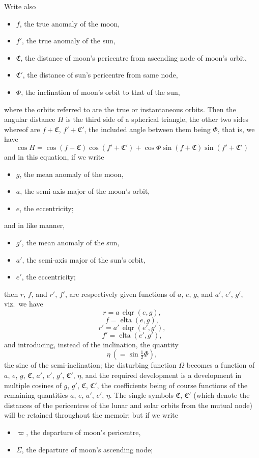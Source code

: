 \documentclass[11pt]{article}
\providecommand{\elqr}{\operatorname{elqr}}
\providecommand{\elta}{\operatorname{elta}}
\begin{document}
\bigskip
{} Write also
\begin{itemize}
\item[] $f$, the true anomaly of the moon,
\item[] $f'$, the true anomaly of the sun,
\item[] $\mathfrak{C}$, the distance of moon's pericentre from ascending node of moon's orbit,
\item[] $\mathfrak{C}'$, the distance of sun's pericentre from same node,
\item[] $\Phi$, the inclination of moon's orbit to that of the sun,
\end{itemize}
where the orbits referred to are the true or instantaneous orbits. Then the angular distance $H$ is the third side of a spherical triangle, the other two sides whereof are $f+\mathfrak{C}$, $f'+\mathfrak{C}'$, the included angle between them being $\Phi$, that is, we have
\[
\cos H = \cos(f+\mathfrak{C})\cos(f'+\mathfrak{C}') + \cos\Phi\sin(f+\mathfrak{C})\sin(f'+\mathfrak{C}')
\]
and in this equation, if we write
\begin{itemize}
\item[] $g$, the mean anomaly of the moon,
\item[] $a$, the semi-axis major of the moon's orbit,
\item[] $e$, the eccentricity;
\end{itemize}
and in like manner,
\begin{itemize}
\item[] $g'$, the mean anomaly of the sun,
\item[] $a'$, the semi-axis major of the sun's orbit,
\item[] $e'$, the eccentricity;
\end{itemize}
then $r$, $f$, and $r'$, $f'$, are respectively given functions of $a$, $e$, $g$, and $a'$, $e'$, $g'$, viz.\ we have
\[
r = a\,\elqr(e,g),
\]
\[
f = \elta(e,g),
\]
\[
r' = a'\,\elqr(e',g'),
\]
\[
f' = \elta(e',g'),
\]
and introducing, instead of the inclination, the quantity
\[
\eta\ (=\sin\tfrac{1}{2}\Phi),
\]
the sine of the semi-inclination; the disturbing function $\Omega$ becomes a function of $a$, $e$, $g$, $\mathfrak{C}$, $a'$, $e'$, $g'$, $\mathfrak{C}'$, $\eta$, and the required development is a development in multiple cosines of $g$, $g'$, $\mathfrak{C}$, $\mathfrak{C}'$, the coefficients being of course functions of the remaining quantities $a$, $e$, $a'$, $e'$, $\eta$. The single symbols $\mathfrak{C}$, $\mathfrak{C}'$ (which denote the distances of the pericentres of the lunar and solar orbits from the mutual node) will be retained throughout the memoir; but if we write
\begin{itemize}
\item[] $\varpi$, the departure of moon's pericentre,
\item[] $\Sigma$, the departure of moon's ascending node;
\end{itemize}
\end{document}
